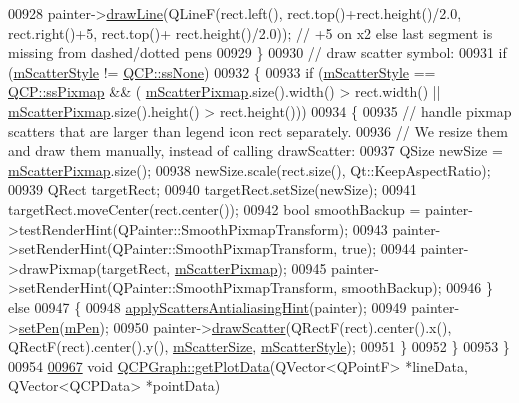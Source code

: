 \begin{DoxyCode}
00928     painter->\hyperlink{a00047_a0b4b1b9bd495e182c731774dc800e6e0}{drawLine}(QLineF(rect.left(), rect.top()+rect.height()/2.0, rect.right()+5, rect.top()+
      rect.height()/2.0)); \textcolor{comment}{// +5 on x2 else last segment is missing from dashed/dotted pens}
00929   \}
00930   \textcolor{comment}{// draw scatter symbol:}
00931   \textcolor{keywordflow}{if} (\hyperlink{a00031_a8f255af6fe1df09cedec73857ca0b344}{mScatterStyle} != \hyperlink{a00143_af66d0711d42fe78d96c28abadc67f26fa3ee9f603bc4623e9b98011e8829aad1d}{QCP::ssNone})
00932   \{
00933     \textcolor{keywordflow}{if} (\hyperlink{a00031_a8f255af6fe1df09cedec73857ca0b344}{mScatterStyle} == \hyperlink{a00143_af66d0711d42fe78d96c28abadc67f26fa3046d385199d0903dd492322ba133e75}{QCP::ssPixmap} && (
      \hyperlink{a00031_a38fccb64b03a53f3ba2839c94dc31e8f}{mScatterPixmap}.size().width() > rect.width() || \hyperlink{a00031_a38fccb64b03a53f3ba2839c94dc31e8f}{mScatterPixmap}.size().height() 
      > rect.height()))
00934     \{
00935       \textcolor{comment}{// handle pixmap scatters that are larger than legend icon rect separately.}
00936       \textcolor{comment}{// We resize them and draw them manually, instead of calling drawScatter:}
00937       QSize newSize = \hyperlink{a00031_a38fccb64b03a53f3ba2839c94dc31e8f}{mScatterPixmap}.size();
00938       newSize.scale(rect.size(), Qt::KeepAspectRatio);
00939       QRect targetRect;
00940       targetRect.setSize(newSize);
00941       targetRect.moveCenter(rect.center());
00942       \textcolor{keywordtype}{bool} smoothBackup = painter->testRenderHint(QPainter::SmoothPixmapTransform);
00943       painter->setRenderHint(QPainter::SmoothPixmapTransform, \textcolor{keyword}{true});
00944       painter->drawPixmap(targetRect, \hyperlink{a00031_a38fccb64b03a53f3ba2839c94dc31e8f}{mScatterPixmap});
00945       painter->setRenderHint(QPainter::SmoothPixmapTransform, smoothBackup);
00946     \} \textcolor{keywordflow}{else}
00947     \{
00948       \hyperlink{a00024_a753272ee225a62827e90c3e1e78de4b1}{applyScattersAntialiasingHint}(painter);
00949       painter->\hyperlink{a00047_af9c7a4cd1791403901f8c5b82a150195}{setPen}(\hyperlink{a00024_a67bc0622fd1b9fa14e54c14922dcec66}{mPen});
00950       painter->\hyperlink{a00047_a3aa145eb9865752d583c40ef995c5049}{drawScatter}(QRectF(rect).center().x(), QRectF(rect).center().y(), 
      \hyperlink{a00031_a0a1d01359f53211427fb4d71a71dbbec}{mScatterSize}, \hyperlink{a00031_a8f255af6fe1df09cedec73857ca0b344}{mScatterStyle});
00951     \}
00952   \}
00953 \}
00954 
\hypertarget{a00115_source_l00967}{}\hyperlink{a00031_af66183533a29520be3e74489ad1449cc}{00967} \textcolor{keywordtype}{void} \hyperlink{a00031_af66183533a29520be3e74489ad1449cc}{QCPGraph::getPlotData}(QVector<QPointF> *lineData, QVector<QCPData> *pointData)\textcolor{keyword}{
}
\end{DoxyCode}
